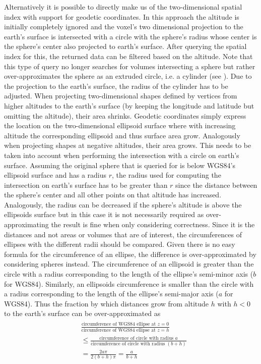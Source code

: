 \documentclass[10pt,conference,compsocconf]{IEEEtran}
\begin{document}
Alternatively it is possible to directly make us of the two-dimensional spatial index with support for geodetic coordinates.
In this approach the altitude is initially completely ignored and the voxel's two dimensional projection to the earth's surface is intersected with a circle with the sphere's radius whose center is the sphere's center also projected to earth's surface.
After querying the spatial index for this, the returned data can be filtered based on the altitude.
Note that this type of query no longer searches for volumes intersecting a sphere but rather over-approximates the sphere as an extruded circle, i.e. a cylinder (see ).
Due to the projection to the earth's surface, the radius of the cylinder has to be adjusted.
When projecting two-dimensional shapes defined by vertices from higher altitudes to the earth's surface (by keeping the longitude and latitude but omitting the altitude), their area shrinks.
Geodetic coordinates simply express the location on the two-dimensional ellipsoid surface where with increasing altitude the corresponding ellipsoid and thus surface area grow.
Analogously when projecting shapes at negative altitudes, their area grows.
This needs to be taken into account when performing the intersection with a circle on earth's surface.
Assuming the original sphere that is queried for is below WGS84's ellipsoid surface and has a radius $r$, the radius used for computing the intersection on earth's surface has to be greater than $r$ since the distance between the sphere's center and all other points on that altitude has increased.
Analogously, the radius can be decreased if the sphere's altitude is above the ellipsoids surface but in this case it is not necessarily required as over-approximating the result is fine when only considering correctness.
Since it is the distances and not areas or volumes that are of interest, the circumferences of ellipses with the different radii should be compared.
Given there is no easy formula for the circumference of an ellipse, the difference is over-approximated by considering spheres instead.
The circumference of an ellipsoid is greater than the circle with a radius corresponding to the length of the ellipse's semi-minor axis ($b$ for WGS84).
Similarly, an ellipsoids circumference is smaller than the circle with a radius corresponding to the length of the ellipse's semi-major axis ($a$ for WGS84).
Thus the fraction by which distances grow from altitude $h$ with $h < 0$ to the earth's surface can be over-approximated as
\begin{align}
\begin{split}
	&\frac{\text{circumference of WGS84 ellipse at }z=0}{\text{circumference of WGS84 ellipse at }z=h}\\
	&\leq \frac{\text{circumference of circle with radius } a}{\text{circumference of circle with radius } (b+h)}\\
	&= \frac{2 a \pi}{2 (b+h) \pi} = \frac{a}{b+h}\\
	&\\
\end{split}
\end{align}
\end{document}
